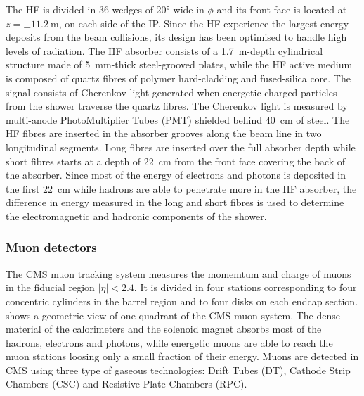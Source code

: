 The HF is divided in 36 wedges of \ang{20} wide in $\phi$ and its front face is located at $z = {\pm}\SI{11.2}{\m}$, on each side of the IP. Since the HF experience the largest energy deposits from the beam collisions, its design has been optimised to handle high levels of radiation. The HF absorber consists of a \SI{1.7}{\m}-depth cylindrical structure made of \SI{5}{\mm}-thick steel-grooved plates, while the HF active medium is composed of quartz fibres of polymer hard-cladding and fused-silica core. The signal consists of Cherenkov light generated when energetic charged particles from the shower traverse the quartz fibres. The Cherenkov light is measured by  multi-anode PhotoMultiplier Tubes (PMT) shielded behind \SI{40}{\cm} of steel. The HF fibres are inserted in the absorber grooves along the beam line in two longitudinal segments. Long fibres are inserted over the full absorber depth while short fibres starts at a depth of \SI{22}{\cm} from the front face covering the back of the absorber. Since most of the energy of electrons and photons is deposited in the first \SI{22}{\cm} while hadrons are able to penetrate more in the HF absorber, the difference in energy measured in the long and short fibres is used to determine the electromagnetic and hadronic components of the shower.


\subsubsection{Muon detectors}

The CMS muon tracking system measures the momemtum and charge of muons in the fiducial region $|\eta| < 2.4$. It is divided in four stations corresponding to four concentric cylinders in the barrel region and to four disks on each endcap section.  shows a geometric view of one quadrant of the CMS muon system. The dense material of the calorimeters and the solenoid magnet absorbs most of the hadrons, electrons and photons, while energetic muons are able to reach the muon stations loosing only a small fraction of their energy. Muons are detected in CMS using three type of gaseous technologies: Drift Tubes (DT), Cathode Strip Chambers (CSC) and Resistive Plate Chambers (RPC).


